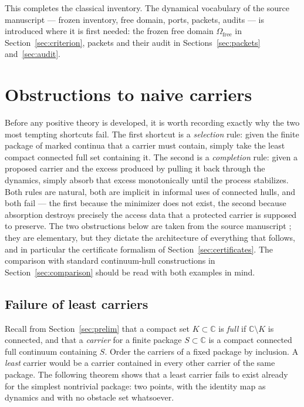 \documentclass[11pt,reqno]{amsart}
\theoremstyle{definition}
\theoremstyle{remark}
\newcommand{\C}{\mathbb C}
\newcommand{\Omfree}{\Omega_{\mathrm{free}}}
\begin{document}
This completes the classical inventory.  The dynamical vocabulary of the
source manuscript --- frozen inventory, free domain, ports, packets,
audits --- is introduced where it is first needed:
the frozen free domain $\Omfree$ in Section~\ref{sec:criterion}, packets
and their audit in Sections~\ref{sec:packets} and~\ref{sec:audit}.


\section{Obstructions to naive carriers}\label{sec:obstructions}

Before any positive theory is developed, it is worth recording exactly why the
two most tempting shortcuts fail. The first shortcut is a \emph{selection}
rule: given the finite package of marked continua that a carrier must contain,
simply take the least compact connected full set containing it. The second is
a \emph{completion} rule: given a proposed carrier and the excess produced by
pulling it back through the dynamics, simply absorb that excess monotonically
until the process stabilizes. Both rules are natural, both are implicit in
informal uses of connected hulls, and both fail --- the first because the
minimizer does not exist, the second because absorption destroys precisely the
access data that a protected carrier is supposed to preserve. The two
obstructions below are taken from the source manuscript
\cite[Theorem~6.12, Proposition~6.15]{MWman}; they are elementary, but they
dictate the architecture of everything that follows, and in particular the
certificate formalism of Section~\ref{sec:certificates}. The comparison with
standard continuum-hull constructions in Section~\ref{sec:comparison} should
be read with both examples in mind.

\subsection{Failure of least carriers}\label{subsec:B-no-least}

Recall from Section~\ref{sec:prelim} that a compact set $K\subset\C$ is
\emph{full} if $\C\setminus K$ is connected, and that a \emph{carrier} for a
finite package $S\subset\C$ is a compact connected full continuum containing
$S$. Order the carriers of a fixed package by inclusion. A \emph{least}
carrier would be a carrier contained in every other carrier of the same
package. The following theorem shows that a least carrier fails to exist
already for the simplest nontrivial package: two points, with the identity
map as dynamics and with no obstacle set whatsoever.
\end{document}
